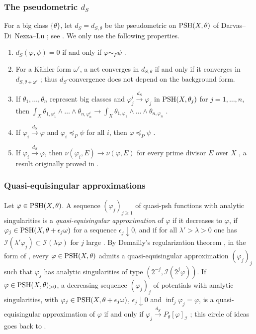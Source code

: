 \documentclass[11pt,a4paper]{amsart}
\newcommand{\dS}{d_{S}}                          %
\newcommand{\lessP}{\preceq_{P}}
\newcommand{\simP}{\sim_{P}}
\theoremstyle{definition}
\begin{document}
\subsubsection*{The pseudometric \texorpdfstring{$\dS$}{dS}}
For a big class $\{\theta\}$, let $\dS=d_{S,\theta}$ be the pseudometric
on $\mathrm{PSH}(X,\theta)$ of Darvas--Di~Nezza--Lu \cite{DDNL21}; see
\cite[Definition~6.2.1]{XiaSGPT}. We only use the following properties.
\begin{enumerate}[label=(\alph*),leftmargin=*,itemsep=.2em,topsep=.3em,resume]
\item\label{it:dS-zero} $\dS(\varphi,\psi)=0$ if and only if
  $\varphi\simP\psi$ \cite[Proposition~6.2.2]{XiaSGPT}.
\item\label{it:dS-background} For a K\"ahler form $\omega'$, a net
  converges in $d_{S,\theta}$ if and only if it converges in
  $d_{S,\theta+\omega'}$ \cite[Corollary~6.2.9]{XiaSGPT}; thus
  $\dS$-convergence does not depend on the background form.
\item\label{it:dS-mass} If $\theta_1,\dots,\theta_n$ represent big
  classes and $\varphi_j^i\xrightarrow{\dS}\varphi_j$ in
  $\mathrm{PSH}(X,\theta_j)$ for $j=1,\dots,n$, then
  $\int_X\theta_{1,\varphi^i_1}\wedge\dots\wedge\theta_{n,\varphi^i_n}
  \to\int_X\theta_{1,\varphi_1}\wedge\dots\wedge\theta_{n,\varphi_n}$
  \cite[Theorem~6.2.1]{XiaSGPT}.
\item\label{it:dS-closed} If $\varphi_i\xrightarrow{\dS}\varphi$ and
  $\varphi_i\lessP\psi$ for all $i$, then $\varphi\lessP\psi$
  \cite[Proposition~6.2.5]{XiaSGPT}.
\item\label{it:dS-lelong} If $\varphi_i\xrightarrow{\dS}\varphi$, then
  $\nu(\varphi_i,E)\to\nu(\varphi,E)$ for every prime divisor $E$ over
  $X$ \cite[Theorem~6.2.4]{XiaSGPT}, a result originally proved in
  \cite{Xia24}.
\end{enumerate}

\subsubsection*{Quasi-equisingular approximations}
Let $\varphi\in\mathrm{PSH}(X,\theta)$. A sequence $(\varphi_j)_{j\ge1}$ of
quasi-psh functions with analytic singularities is a
\emph{quasi-equisingular approximation} of $\varphi$ if it decreases to
$\varphi$, if $\varphi_j\in\mathrm{PSH}(X,\theta+\epsilon_j\omega)$ for a
sequence $\epsilon_j\downarrow0$, and if for all $\lambda'>\lambda>0$
one has $\mathcal I(\lambda'\varphi_j)\subset\mathcal I(\lambda\varphi)$
for $j$ large \cite[Definition~1.6.4]{XiaSGPT}. By Demailly's
regularization theorem \cite{Dem92,DPS01}, in the form of
\cite[Theorem~1.6.2]{XiaSGPT}, every $\varphi\in\mathrm{PSH}(X,\theta)$ admits a
quasi-equisingular approximation $(\varphi_j)_j$ such that $\varphi_j$ has
analytic singularities of type $(2^{-j},\mathcal I(2^j\varphi))$. If
$\varphi\in\mathrm{PSH}(X,\theta)_{>0}$, a decreasing sequence $(\varphi_j)_j$ of
potentials with analytic singularities, with
$\varphi_j\in\mathrm{PSH}(X,\theta+\epsilon_j\omega)$, $\epsilon_j\downarrow0$ and
$\inf_j\varphi_j=\varphi$, is a quasi-equisingular approximation of
$\varphi$ if and only if $\varphi_j\xrightarrow{\dS}P_\theta[\varphi]_\mathcal I$
\cite[Corollary~7.1.2]{XiaSGPT}; this circle of ideas goes back to
\cite{DX22,DX24b}.
\end{document}
